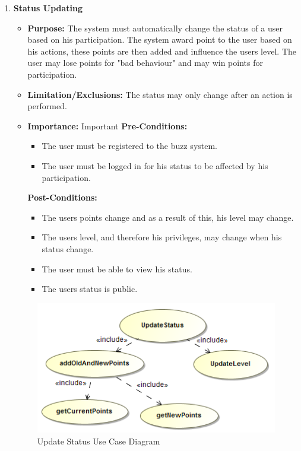 \documentclass[11pt]{article}
\begin{document}
\begin{enumerate}
\item \textbf{Status Updating}
\begin{itemize}
\item \textbf{Purpose: }The system must automatically change the status of a user based on his participation. The system award point to the user based on his actions, these points are then added and influence the users level. The user may lose points for "bad behaviour" and may win points for participation.
 

	\item  \textbf{Limitation/Exclusions: } The status may only change after an action is performed.

\item \textbf{Importance:} Important \newline
\textbf{Pre-Conditions: }
	\begin{itemize}
		\item The user must be registered to the buzz system.
		\item The user must be logged in for his status to be affected by his participation.

	\end{itemize}

\textbf{Post-Conditions: }
	\begin{itemize}
		\item The users points change and as a result of this, his level may change.
		\item The users level, and therefore his privileges, may change when his status change.
		\item The user must be able to view his status.
		\item The users status is public.
	\end{itemize}
\end{itemize}

\graphicspath{ {../Diagrams/Maret/usecase/} }	
	\begin{figure}[H]	
    	\includegraphics[scale=0.5]{UpdateStatus.png}
    	\caption{Update Status Use Case Diagram}
	\end{figure}
	

\end{enumerate}
\end{document}
